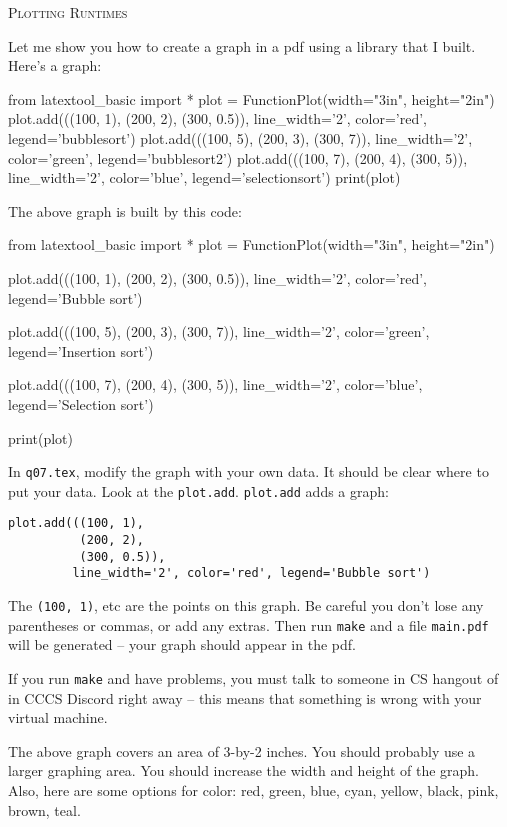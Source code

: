 \newpage\textsc{Plotting Runtimes}

Let me show you how to create a graph in a pdf using a library that I built.
Here's a graph:

\begin{python}
from latextool_basic import *
plot = FunctionPlot(width="3in", height="2in")
plot.add(((100, 1),
          (200, 2),
          (300, 0.5)),
          line_width='2', color='red', legend='bubblesort')
plot.add(((100, 5),
          (200, 3),
          (300, 7)),
          line_width='2', color='green', legend='bubblesort2')
plot.add(((100, 7),
          (200, 4),
          (300, 5)), line_width='2', color='blue', legend='selectionsort')
print(plot)
\end{python}

The above graph is built by this code:
\begin{console}[fontsize=\footnotesize]
\begin{python}
from latextool_basic import *
plot = FunctionPlot(width="3in", height="2in")

plot.add(((100, 1),
          (200, 2),
          (300, 0.5)),
         line_width='2', color='red', legend='Bubble sort')
         
plot.add(((100, 5),
          (200, 3),
          (300, 7)),
         line_width='2', color='green', legend='Insertion sort')
         
plot.add(((100, 7),
          (200, 4),
          (300, 5)),
         line_width='2', color='blue', legend='Selection sort')

print(plot)
\end{python}
\end{console}

In \verb!q07.tex!, modify the graph with your own data.
It should be clear where to put your data.
Look at the \verb!plot.add!.
\verb!plot.add! adds a graph:
\begin{Verbatim}[frame=single,fontsize=\footnotesize]
plot.add(((100, 1),
          (200, 2),
          (300, 0.5)),
         line_width='2', color='red', legend='Bubble sort')
\end{Verbatim}
The \verb!(100, 1)!, etc are the points on this graph.
Be careful you don't lose any parentheses or commas, or add any extras.
Then run \verb!make! and a file \verb!main.pdf! will be
generated -- your graph should appear in the pdf.

If you run \verb!make! and have problems, you must talk to
someone in CS hangout of in CCCS Discord right away --
this means that something is wrong with your
virtual machine.

The above graph covers an area of 3-by-2 inches.
You should probably use a larger graphing area.
You should increase the width and height of the graph.
Also, here are some options for color:
red,
green,
blue,
cyan,
yellow,
black,
pink,
brown,
teal.
